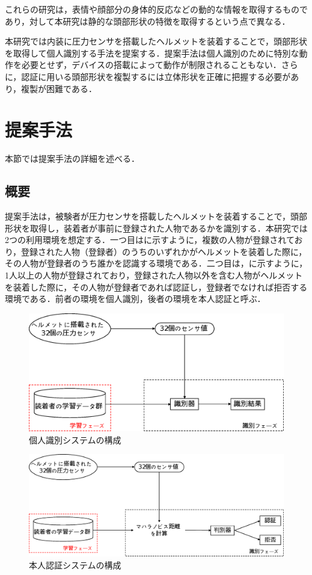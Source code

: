 \documentclass[Japanese,noauthor]{dicomopapers}
\begin{document}
これらの研究は，表情や顔部分の身体的反応などの動的な情報を取得するものであり，対して本研究は静的な頭部形状の特徴を取得するという点で異なる．

本研究では内装に圧力センサを搭載したヘルメットを装着することで，頭部形状を取得して個人識別する手法を提案する．提案手法は個人識別のために特別な動作を必要とせず，デバイスの搭載によって動作が制限されることもない．さらに，認証に用いる頭部形状を複製するには立体形状を正確に把握する必要があり，複製が困難である．

\section{提案手法}
\label{method}
本節では提案手法の詳細を述べる．

\subsection{概要}
提案手法は，被験者が圧力センサを搭載したヘルメットを装着することで，頭部形状を取得し，装着者が事前に登録された人物であるかを識別する．本研究では2つの利用環境を想定する．一つ目はに示すように，複数の人物が登録されており，登録された人物（登録者）のうちのいずれかがヘルメットを装着した際に，その人物が登録者のうち誰かを認識する環境である．二つ目は，に示すように，1人以上の人物が登録されており，登録された人物以外を含む人物がヘルメットを装着した際に，その人物が登録者であれば認証し，登録者でなければ拒否する環境である．前者の環境を個人識別，後者の環境を本人認証と呼ぶ．

\begin{figure}[!t]
  \centering
    \includegraphics[width=1\linewidth]{figure/system_classification.eps}
  \caption{個人識別システムの構成}
  \label{system_classification}
\end{figure}

\begin{figure}[!t]
  \centering
    \includegraphics[width=1\linewidth]{figure/system_mahalnobis.eps}
  \caption{本人認証システムの構成}
  \label{system_mahalnobis}
\end{figure}
\end{document}
